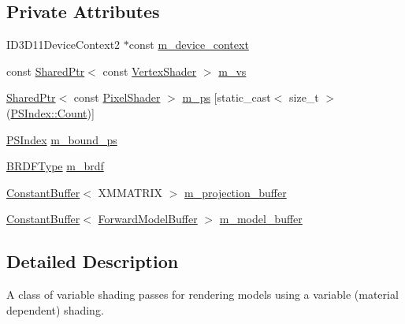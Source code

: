 \subsection*{Private Attributes}
\begin{DoxyCompactItemize}
\item 
I\+D3\+D11\+Device\+Context2 $\ast$const \hyperlink{classmage_1_1_variable_shading_pass_afff786ea38b64ba069866fdd6b525ba7}{m\+\_\+device\+\_\+context}
\item 
const \hyperlink{namespacemage_a1e01ae66713838a7a67d30e44c67703e}{Shared\+Ptr}$<$ const \hyperlink{classmage_1_1_vertex_shader}{Vertex\+Shader} $>$ \hyperlink{classmage_1_1_variable_shading_pass_aa91a1e8628c2f671adadd919376aa67e}{m\+\_\+vs}
\item 
\hyperlink{namespacemage_a1e01ae66713838a7a67d30e44c67703e}{Shared\+Ptr}$<$ const \hyperlink{namespacemage_a27ecaf266420ee7a494d64edc0757129}{Pixel\+Shader} $>$ \hyperlink{classmage_1_1_variable_shading_pass_aacd5b6b967a0fcfe7510e289c3d630a0}{m\+\_\+ps} \mbox{[}static\+\_\+cast$<$ size\+\_\+t $>$(\hyperlink{classmage_1_1_variable_shading_pass_a49519e421ac5be93136d9efdbf075d4aae93f994f01c537c4e2f7d8528c3eb5e9}{P\+S\+Index\+::\+Count})\mbox{]}
\item 
\hyperlink{classmage_1_1_variable_shading_pass_a49519e421ac5be93136d9efdbf075d4a}{P\+S\+Index} \hyperlink{classmage_1_1_variable_shading_pass_acb1d0d78a9de9afc2d668d87134c5ec5}{m\+\_\+bound\+\_\+ps}
\item 
\hyperlink{namespacemage_ae7a7a03a7b34d7e2689689bb8295cd38}{B\+R\+D\+F\+Type} \hyperlink{classmage_1_1_variable_shading_pass_ac6147f2068fd7727fe2d78584ff68767}{m\+\_\+brdf}
\item 
\hyperlink{structmage_1_1_constant_buffer}{Constant\+Buffer}$<$ X\+M\+M\+A\+T\+R\+IX $>$ \hyperlink{classmage_1_1_variable_shading_pass_afb777eb7b7303dd50337f361f82a919a}{m\+\_\+projection\+\_\+buffer}
\item 
\hyperlink{structmage_1_1_constant_buffer}{Constant\+Buffer}$<$ \hyperlink{structmage_1_1_forward_model_buffer}{Forward\+Model\+Buffer} $>$ \hyperlink{classmage_1_1_variable_shading_pass_a563f4a9d0b9c4512f63daaec19ee4750}{m\+\_\+model\+\_\+buffer}
\end{DoxyCompactItemize}


\subsection{Detailed Description}
A class of variable shading passes for rendering models using a variable (material dependent) shading. 

